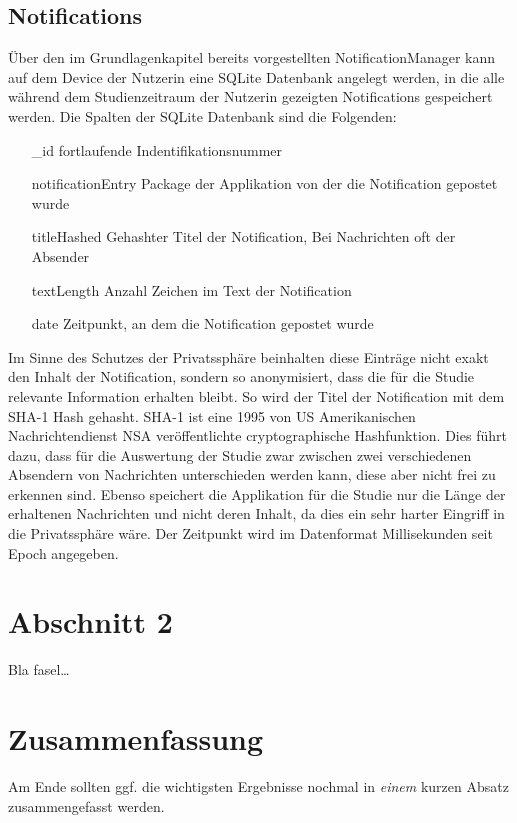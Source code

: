 \subsection{Notifications}


Über den im Grundlagenkapitel bereits vorgestellten NotificationManager kann auf dem Device der Nutzerin eine SQLite Datenbank angelegt werden,
in die alle während dem Studienzeitraum der Nutzerin gezeigten Notifications gespeichert werden.
Die Spalten der SQLite Datenbank sind die Folgenden:
\begin{itemize}
    \item [\_id] fortlaufende Indentifikationsnummer
    \item [notificationEntry] Package der Applikation von der die Notification gepostet wurde
    \item [titleHashed] Gehashter Titel der Notification, Bei Nachrichten oft der Absender
    \item [textLength] Anzahl Zeichen im Text der Notification
    \item [date] Zeitpunkt, an dem die Notification gepostet wurde
\end{itemize}

Im Sinne des Schutzes der Privatssphäre beinhalten diese Einträge nicht exakt den Inhalt der Notification, sondern so anonymisiert, dass die für die Studie relevante Information erhalten bleibt.
So wird der Titel der Notification mit dem SHA-1 Hash\cite{sha1def} gehasht.
SHA-1 ist eine 1995 von US Amerikanischen Nachrichtendienst NSA veröffentlichte cryptographische Hashfunktion\cite{sha1proposal}.
Dies führt dazu, dass für die Auswertung der Studie zwar zwischen zwei verschiedenen Absendern von Nachrichten unterschieden werden kann, diese aber nicht frei zu erkennen sind.
Ebenso speichert die Applikation für die Studie nur die Länge der erhaltenen Nachrichten und nicht deren Inhalt, da dies ein sehr harter Eingriff in die Privatssphäre wäre.
Der Zeitpunkt wird im Datenformat Millisekunden seit Epoch angegeben.



\section{Abschnitt 2}
\label{ch:Entwurf:sec:Abschnitt2}

Bla fasel\ldots

\section{Zusammenfassung}
\label{ch:Entwurf:sec:zusammenfassung}

Am Ende sollten ggf. die wichtigsten Ergebnisse nochmal in \emph{einem}
kurzen Absatz zusammengefasst werden.

